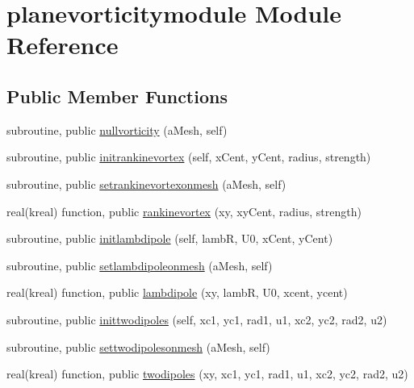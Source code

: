 \hypertarget{classplanevorticitymodule}{\section{planevorticitymodule Module Reference}
\label{classplanevorticitymodule}
}
\subsection*{Public Member Functions}
\begin{DoxyCompactItemize}
\item 
subroutine, public \hyperlink{classplanevorticitymodule_a792d9a7093210996abc80f424f85c7d6}{nullvorticity} (a\+Mesh, self)
\item 
subroutine, public \hyperlink{classplanevorticitymodule_a9b7b36b540cdde3dff4f595ee17fac91}{initrankinevortex} (self, x\+Cent, y\+Cent, radius, strength)
\item 
subroutine, public \hyperlink{classplanevorticitymodule_afd6c2846a65d4596cc18426a5caa598f}{setrankinevortexonmesh} (a\+Mesh, self)
\item 
real(kreal) function, public \hyperlink{classplanevorticitymodule_af0557ea6784c39805e01abbb4ee70991}{rankinevortex} (xy, xy\+Cent, radius, strength)
\item 
subroutine, public \hyperlink{classplanevorticitymodule_aab0e291683ba215bdd68fb624f9dbcfe}{initlambdipole} (self, lamb\+R, U0, x\+Cent, y\+Cent)
\item 
subroutine, public \hyperlink{classplanevorticitymodule_a8781b59d1db37580d3e49f91c06633a1}{setlambdipoleonmesh} (a\+Mesh, self)
\item 
real(kreal) function, public \hyperlink{classplanevorticitymodule_a5c84e5ec68efb64cf335e7e725739ac4}{lambdipole} (xy, lamb\+R, U0, xcent, ycent)
\item 
subroutine, public \hyperlink{classplanevorticitymodule_a5b26b74f091d010b645d0a2179cfc431}{inittwodipoles} (self, xc1, yc1, rad1, u1, xc2, yc2, rad2, u2)
\item 
subroutine, public \hyperlink{classplanevorticitymodule_a8cde7121f564c397cb43cbef1dbbe11a}{settwodipolesonmesh} (a\+Mesh, self)
\item 
real(kreal) function, public \hyperlink{classplanevorticitymodule_acd89b05d84d480879fc8eaa4e0875330}{twodipoles} (xy, xc1, yc1, rad1, u1, xc2, yc2, rad2, u2)
\end{DoxyCompactItemize}

